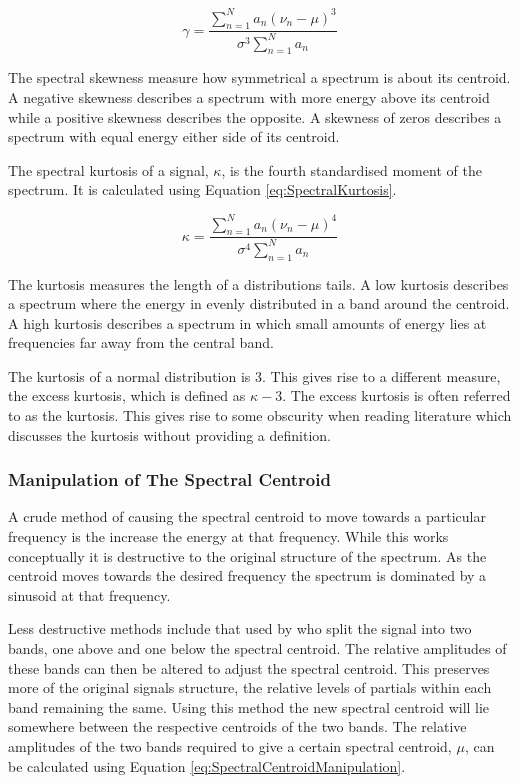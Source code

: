 		\begin{equation}
			\gamma = \frac{\sum_{n = 1}^{N} a_{n}(\nu_{n} - \mu)^{3}}
				      {\sigma^{3}\sum_{n = 1}^{N} a_{n}}
			\label{eq:SpectralSkewness}
		\end{equation}

		The spectral skewness measure how symmetrical a spectrum is about its centroid. A negative skewness
		describes a spectrum with more energy above its centroid while a positive skewness describes the opposite.
		A skewness of zeros describes a spectrum with equal energy either side of its centroid.

		The spectral kurtosis of a signal, $\kappa$, is the fourth standardised moment of the spectrum. It
		is calculated using Equation \ref{eq:SpectralKurtosis}.

		\begin{equation}
			\kappa = \frac{\sum_{n = 1}^{N} a_{n}(\nu_{n} - \mu)^{4}}
				      {\sigma^{4}\sum_{n = 1}^{N} a_{n}}
			\label{eq:SpectralKurtosis}
		\end{equation}

		The kurtosis measures the length of a distributions tails. A low kurtosis describes a spectrum where the
		energy in evenly distributed in a band around the centroid. A high kurtosis describes a spectrum in which
		small amounts of energy lies at frequencies far away from the central band.

		The kurtosis of a normal distribution is 3. This gives rise to a different measure, the excess kurtosis,
		which is defined as $\kappa - 3$. The excess kurtosis is often referred to as the kurtosis. This gives rise
		to some obscurity when reading literature which discusses the kurtosis without providing a definition.

		\subsubsection*{Manipulation of The Spectral Centroid}
			A crude method of causing the spectral centroid to move towards a particular frequency is the
			increase the energy at that frequency. While this works conceptually it is destructive to the
			original structure of the spectrum. As the centroid moves towards the desired frequency the
			spectrum is dominated by a sinusoid at that frequency.

			Less destructive methods include that used by \citet{zacharakis2011an} who split the signal into
			two bands, one above and one below the spectral centroid. The relative amplitudes of these bands
			can then be altered to adjust the spectral centroid. This preserves more of the original signals
			structure, the relative levels of partials within each band remaining the same. Using this method
			the new spectral centroid will lie somewhere between the respective centroids of the two bands. The
			relative amplitudes of the two bands required to give a certain spectral centroid, $\mu$, can be
			calculated using Equation \ref{eq:SpectralCentroidManipulation}.

